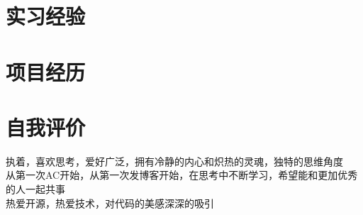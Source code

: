 \documentclass[a4paper,8pt]{article}
\begin{document}
\section{\textbf{实习经验}}


\section{\textbf{项目经历}}



\section{\textbf{自我评价}}
执着，喜欢思考，爱好广泛，拥有冷静的内心和炽热的灵魂，独特的思维角度 \\
从第一次AC开始，从第一次发博客开始，在思考中不断学习，希望能和更加优秀的人一起共事 \\
热爱开源，热爱技术，对代码的美感深深的吸引

\vfill
{}
\end{document}
